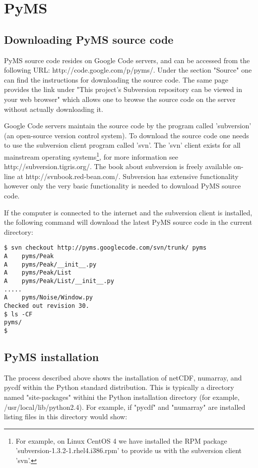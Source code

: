\section{PyMS}

\subsection{Downloading PyMS source code}

PyMS source code resides on Google Code servers, and can be accessed
from the following URL: http://code.google.com/p/pyms/. Under the
section "Source" one can find the instructions for downloading the
source code. The same page provides the link under "This project's
Subversion repository can be viewed in your web browser" which allows
one to browse the source code on the server without actually downloading
it.

Google Code servers maintain the source code by the program called
'subversion' (an open-source version control system).  To download the
source code one needs to use the subversion client program called 'svn'.
The 'svn' client exists for all mainstream operating systems\footnote{For
example, on Linux CentOS 4 we have installed the RPM package
'subversion-1.3.2-1.rhel4.i386.rpm' to provide us with the subversion
client 'svn'.}, for more information see http://subversion.tigris.org/.
The book about subversion is freely available on-line at
http://svnbook.red-bean.com/. Subversion has extensive functionality
however only the very basic functionality is needed to download PyMS
source code.

If the computer is connected to the internet and the subversion client
is installed, the following command will download the latest PyMS 
source code in the current directory:

\begin{verbatim}
$ svn checkout http://pyms.googlecode.com/svn/trunk/ pyms
A    pyms/Peak
A    pyms/Peak/__init__.py
A    pyms/Peak/List
A    pyms/Peak/List/__init__.py
.....
A    pyms/Noise/Window.py
Checked out revision 30.
$ ls -CF
pyms/
$
\end{verbatim}

\subsection{PyMS installation}

The process described above shows the installation of netCDF, numarray,
and pycdf within the Python standard distribution. This is typically
a directory named "site-packages" withini the Python installation
directory (for example, /usr/local/lib/python2.4). For example, if
"pycdf" and "numarray" are installed listing files in this directory
would show:

